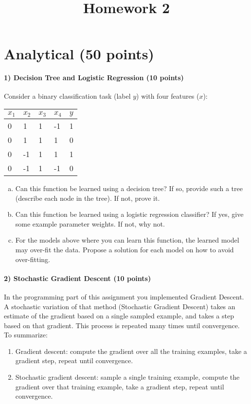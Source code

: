\documentclass{article}
\begin{document}
\title{Homework 2}
\maketitle
\thispagestyle{fancy}

\section*{Analytical (50 points)}

\paragraph{1) Decision Tree and Logistic Regression (10 points)}
Consider a binary classification task (label $y$) with four features ($x$):

\begin{tabular}{ |l|l|l|l|l| }
	\hline
	$x_1$ & $x_2$ & $x_3$ & $x_4$ & $y$ \\
	\hline
	0& 1 & 1& -1 & 1 \\
	0&  1 & 1& 1 & 0 \\
	0&  -1 & 1& 1 & 1 \\
	0&  -1 & 1& -1 & 0 \\
	\hline
\end{tabular}

\begin{enumerate}[(a)]
	\item Can this function be learned using a decision tree? If so, provide such a tree (describe each node in the tree). If not, prove it.

	\item Can this function be learned using a logistic regression classifier? If yes, give some example parameter weights. If not, why not.

	\item For the models above where you can learn this function, the learned model may over-fit the data. Propose a solution for each model on how to avoid over-fitting.
\end{enumerate}

\paragraph{2) Stochastic Gradient Descent (10 points)}
In the programming part of this assignment you implemented Gradient Descent. A stochastic variation of that method (Stochastic Gradient Descent) takes an estimate of the gradient based on a single sampled example, and takes a step based on that gradient. This process is repeated many times until convergence. To summarize:
\begin{enumerate}
	\item Gradient descent: compute the gradient over all the training examples, take a gradient step, repeat until convergence.
	\item Stochastic gradient descent: sample a single training example, compute the gradient over that training example, take a gradient step, repeat until convergence.
\end{enumerate}
\end{document}
